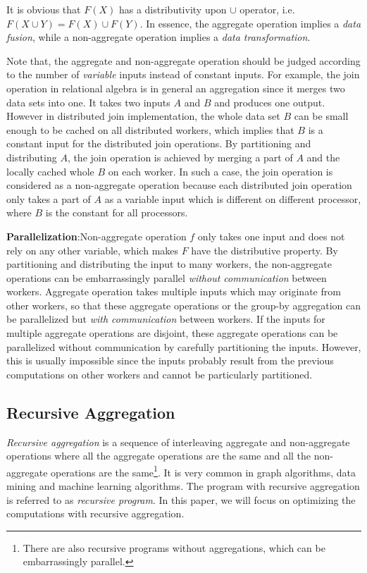 \documentclass{vldb}
\begin{document}
 It is obvious that $F(X)$ has a distributivity upon $\cup$ operator, i.e.$F(X \cup Y)=F(X) \cup F(Y)$.
In essence, the aggregate operation implies a \emph{data fusion}, while a non-aggregate operation implies a \emph{data transformation}.

Note that, the aggregate and non-aggregate operation should be judged according to the number of \emph{variable} inputs instead of constant inputs. For example, the join operation in relational algebra is in general an aggregation since it merges two data sets into one. It takes two inputs $A$ and $B$ and produces one output. However in distributed join implementation, the whole data set $B$ can be small enough to be cached on all distributed workers, which implies that $B$ is a constant input for the distributed join operations. By partitioning and distributing $A$, the join operation is achieved by merging a part of $A$ and the locally cached whole $B$ on each worker. In such a case, the join operation is considered as a non-aggregate operation because each distributed join operation only takes a part of $A$ as a variable input which is different on different processor, where $B$ is the constant for all processors.

\textbf{Parallelization}:Non-aggregate operation $f$ only takes one input and does not rely on any other variable, which makes $F$ have the distributive property. By partitioning and distributing the input to many workers, the non-aggregate operations can be embarrassingly parallel \emph{without communication} between workers. Aggregate operation takes multiple inputs which may originate from other workers, so that these aggregate operations or the group-by aggregation can be parallelized but \emph{with communication} between workers. If the inputs for multiple aggregate operations are disjoint, these aggregate operations can be parallelized without communication by carefully partitioning the inputs. However, this is usually impossible since the inputs probably result from the previous computations on other workers and cannot be particularly partitioned.



\subsection{Recursive Aggregation}


\emph{Recursive aggregation} is a sequence of interleaving aggregate and non-aggregate operations where all the aggregate operations are the same and all the non-aggregate operations are the same\footnote{There are also recursive programs without aggregations, which can be embarrassingly parallel.}. It is very common in graph algorithms, data mining and machine learning algorithms. The program with recursive aggregation is referred to as \emph{recursive program}. In this paper, we will focus on optimizing the computations with recursive aggregation.
\end{document}
